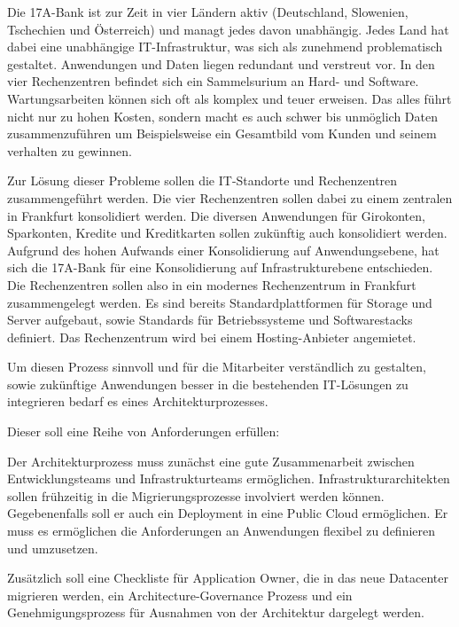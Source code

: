 Die 17A-Bank ist zur Zeit in vier Ländern aktiv (Deutschland, Slowenien, Tschechien und Österreich) und managt jedes davon unabhängig. Jedes Land hat dabei eine unabhängige IT-Infrastruktur, was sich als zunehmend problematisch gestaltet. Anwendungen und Daten liegen redundant und verstreut vor. In den vier Rechenzentren befindet sich ein Sammelsurium an Hard- und Software. Wartungsarbeiten können sich oft als komplex und teuer erweisen. Das alles führt nicht nur zu hohen Kosten, sondern macht es auch schwer bis unmöglich Daten zusammenzuführen um Beispielsweise ein Gesamtbild vom Kunden und seinem verhalten zu gewinnen. 

Zur Lösung dieser Probleme sollen die IT-Standorte und Rechenzentren zusammengeführt werden. Die vier Rechenzentren sollen dabei zu einem zentralen in Frankfurt konsolidiert werden. Die diversen Anwendungen für Girokonten, Sparkonten, Kredite und Kreditkarten sollen zukünftig auch konsolidiert werden. Aufgrund des hohen Aufwands einer Konsolidierung auf Anwendungsebene, hat sich die 17A-Bank für eine Konsolidierung auf Infrastrukturebene entschieden. Die Rechenzentren sollen also in ein modernes Rechenzentrum in Frankfurt zusammengelegt werden. Es sind bereits Standardplattformen für Storage und Server aufgebaut, sowie Standards für Betriebssysteme und Softwarestacks definiert. Das Rechenzentrum wird bei einem Hosting-Anbieter angemietet.

Um diesen Prozess sinnvoll und für die Mitarbeiter verständlich zu gestalten, sowie zukünftige Anwendungen besser in die bestehenden IT-Lösungen zu integrieren bedarf es eines Architekturprozesses.

Dieser soll eine Reihe von Anforderungen erfüllen:

Der Architekturprozess muss zunächst eine gute Zusammenarbeit zwischen Entwicklungsteams und Infrastrukturteams ermöglichen. Infrastrukturarchitekten sollen frühzeitig in die Migrierungsprozesse involviert werden können. Gegebenenfalls soll er auch ein Deployment in eine Public Cloud ermöglichen. Er muss es ermöglichen die Anforderungen an Anwendungen flexibel zu definieren und umzusetzen.

Zusätzlich soll eine Checkliste für Application Owner, die in das neue Datacenter migrieren werden, ein Architecture-Governance Prozess und ein Genehmigungsprozess für Ausnahmen von der Architektur dargelegt werden.
